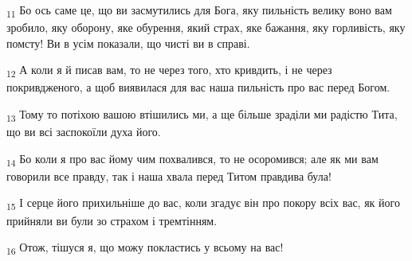 \begin{tcolorbox}
\textsubscript{11} Бо ось саме це, що ви засмутились для Бога, яку пильність велику воно вам зробило, яку оборону, яке обурення, який страх, яке бажання, яку горливість, яку помсту! Ви в усім показали, що чисті ви в справі.
\end{tcolorbox}
\begin{tcolorbox}
\textsubscript{12} А коли я й писав вам, то не через того, хто кривдить, і не через покривдженого, а щоб виявилася для вас наша пильність про вас перед Богом.
\end{tcolorbox}
\begin{tcolorbox}
\textsubscript{13} Тому то потіхою вашою втішились ми, а ще більше зраділи ми радістю Тита, що ви всі заспокоїли духа його.
\end{tcolorbox}
\begin{tcolorbox}
\textsubscript{14} Бо коли я про вас йому чим похвалився, то не осоромився; але як ми вам говорили все правду, так і наша хвала перед Титом правдива була!
\end{tcolorbox}
\begin{tcolorbox}
\textsubscript{15} І серце його прихильніше до вас, коли згадує він про покору всіх вас, як його прийняли ви були зо страхом і тремтінням.
\end{tcolorbox}
\begin{tcolorbox}
\textsubscript{16} Отож, тішуся я, що можу покластись у всьому на вас!
\end{tcolorbox}
